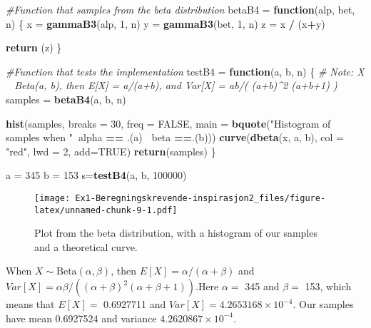 \documentclass[
]{article}
\newenvironment{Shaded}{\begin{snugshade}}{\end{snugshade}}
\newcommand{\CommentTok}[1]{\textcolor[rgb]{0.56,0.35,0.01}{\textit{#1}}}
\newcommand{\ControlFlowTok}[1]{\textcolor[rgb]{0.13,0.29,0.53}{\textbf{#1}}}
\newcommand{\DataTypeTok}[1]{\textcolor[rgb]{0.13,0.29,0.53}{#1}}
\newcommand{\DecValTok}[1]{\textcolor[rgb]{0.00,0.00,0.81}{#1}}
\newcommand{\KeywordTok}[1]{\textcolor[rgb]{0.13,0.29,0.53}{\textbf{#1}}}
\newcommand{\NormalTok}[1]{#1}
\newcommand{\OperatorTok}[1]{\textcolor[rgb]{0.81,0.36,0.00}{\textbf{#1}}}
\newcommand{\OtherTok}[1]{\textcolor[rgb]{0.56,0.35,0.01}{#1}}
\newcommand{\StringTok}[1]{\textcolor[rgb]{0.31,0.60,0.02}{#1}}
\begin{document}
\begin{Shaded}
\begin{Highlighting}[]
\CommentTok{#Function that samples from the beta distribution}
\NormalTok{betaB4 =}\StringTok{ }\ControlFlowTok{function}\NormalTok{(alp, bet, n) \{}
\NormalTok{  x =}\StringTok{ }\KeywordTok{gammaB3}\NormalTok{(alp, }\DecValTok{1}\NormalTok{, n)}
\NormalTok{  y =}\StringTok{ }\KeywordTok{gammaB3}\NormalTok{(bet, }\DecValTok{1}\NormalTok{, n)}
\NormalTok{  z =}\StringTok{ }\NormalTok{x }\OperatorTok{/}\StringTok{ }\NormalTok{(x}\OperatorTok{+}\NormalTok{y)}
  
  \KeywordTok{return}\NormalTok{ (z)}
\NormalTok{\}}

\CommentTok{#Function that tests the implementation}
\NormalTok{testB4 =}\StringTok{ }\ControlFlowTok{function}\NormalTok{(a, b, n) \{}
  \CommentTok{# Note: X ~ Beta(a, b), then E[X] = a/(a+b), and Var[X] = ab/( (a+b)^2 (a+b+1) )}
\NormalTok{  samples =}\StringTok{ }\KeywordTok{betaB4}\NormalTok{(a, b, n)}
  
  \KeywordTok{hist}\NormalTok{(samples, }\DataTypeTok{breaks =} \DecValTok{30}\NormalTok{, }\DataTypeTok{freq =} \OtherTok{FALSE}\NormalTok{, }\DataTypeTok{main =} \KeywordTok{bquote}\NormalTok{(}\StringTok{"Histogram of samples when "}\OperatorTok{~}\NormalTok{alpha }\OperatorTok{==}\StringTok{ }\NormalTok{.(a) }\OperatorTok{~}\NormalTok{beta }\OperatorTok{==}\NormalTok{.(b)))}
  \KeywordTok{curve}\NormalTok{(}\KeywordTok{dbeta}\NormalTok{(x, a, b), }\DataTypeTok{col =} \StringTok{"red"}\NormalTok{, }\DataTypeTok{lwd =} \DecValTok{2}\NormalTok{, }\DataTypeTok{add=}\OtherTok{TRUE}\NormalTok{)}
  \KeywordTok{return}\NormalTok{(samples)}
\NormalTok{\}}

\NormalTok{a =}\StringTok{ }\DecValTok{345}
\NormalTok{b =}\StringTok{ }\DecValTok{153}
\NormalTok{s=}\KeywordTok{testB4}\NormalTok{(a, b, }\DecValTok{100000}\NormalTok{)}
\end{Highlighting}
\end{Shaded}

\begin{figure}
\centering
\texttt{[image: Ex1-Beregningskrevende-inspirasjon2\_files/figure-latex/unnamed-chunk-9-1.pdf]}
\caption{Plot from the beta distribution, with a histogram of our
samples and a theoretical curve.}
\end{figure}

When \(X\sim\text{Beta}(\alpha,\beta)\), then
\(E[X]=\alpha/(\alpha+\beta)\) and
\(Var[X]=\alpha\beta/((\alpha+\beta)^2(\alpha+\beta+1))\).Here
\(\alpha =\) 345 and \(\beta=\) 153, which means that \(E[X]=\)
0.6927711 and \(Var[X]=\)\ensuremath{4.2653168\times 10^{-4}}. Our
samples have mean 0.6927524 and variance
\ensuremath{4.2620867\times 10^{-4}}.
\end{document}
